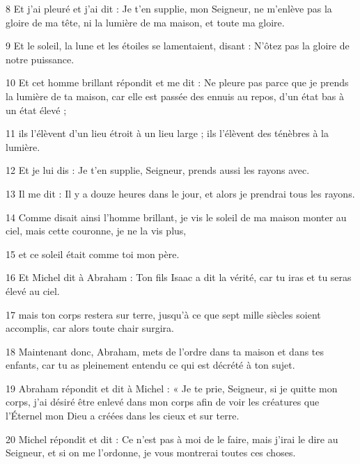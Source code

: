 \par 8 Et j'ai pleuré et j'ai dit : Je t'en supplie, mon Seigneur, ne m'enlève pas la gloire de ma tête, ni la lumière de ma maison, et toute ma gloire.

\par 9 Et le soleil, la lune et les étoiles se lamentaient, disant : N'ôtez pas la gloire de notre puissance.

\par 10 Et cet homme brillant répondit et me dit : Ne pleure pas parce que je prends la lumière de ta maison, car elle est passée des ennuis au repos, d'un état bas à un état élevé ;

\par 11 ils l'élèvent d'un lieu étroit à un lieu large ; ils l'élèvent des ténèbres à la lumière.

\par 12 Et je lui dis : Je t'en supplie, Seigneur, prends aussi les rayons avec.

\par 13 Il me dit : Il y a douze heures dans le jour, et alors je prendrai tous les rayons.

\par 14 Comme disait ainsi l'homme brillant, je vis le soleil de ma maison monter au ciel, mais cette couronne, je ne la vis plus,

\par 15 et ce soleil était comme toi mon père.

\par 16 Et Michel dit à Abraham : Ton fils Isaac a dit la vérité, car tu iras et tu seras élevé au ciel.

\par 17 mais ton corps restera sur terre, jusqu'à ce que sept mille siècles soient accomplis, car alors toute chair surgira.

\par 18 Maintenant donc, Abraham, mets de l'ordre dans ta maison et dans tes enfants, car tu as pleinement entendu ce qui est décrété à ton sujet.

\par 19 Abraham répondit et dit à Michel : « Je te prie, Seigneur, si je quitte mon corps, j'ai désiré être enlevé dans mon corps afin de voir les créatures que l'Éternel mon Dieu a créées dans les cieux et sur terre.

\par 20 Michel répondit et dit : Ce n'est pas à moi de le faire, mais j'irai le dire au Seigneur, et si on me l'ordonne, je vous montrerai toutes ces choses.

